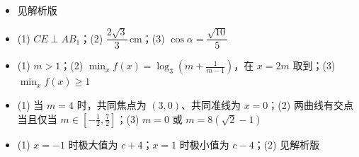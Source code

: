 \begin{itemize}[leftmargin=2.6em]
  \item[\textbf{一.}] 见解析版
  \item[\textbf{二.}] (1) $CE\perp AB_1$；(2) $\dfrac{2\sqrt3}{3}\,\mathrm{cm}$；(3) $\cos\alpha=\dfrac{\sqrt{10}}5$
  \item[\textbf{三.}] (1) $m>1$；(2) $\displaystyle\min_x f(x)=\log_3\!\left(m+\frac1{m-1}\right)$，在 $x=2m$ 取到；(3) $\min_x f(x)\geq1$
  \item[\textbf{四.}] (1) 当 $m=4$ 时，共同焦点为 $(3,0)$、共同准线为 $x=0$；(2) 两曲线有交点当且仅当 $m\in[-\tfrac12,\tfrac72]$；(3) $m=0$ 或 $m=8(\sqrt2-1)$
  \item[\textbf{五.}] (1) $x=-1$ 时极大值为 $c+4$；$x=1$ 时极小值为 $c-4$；(2) 见解析版
\end{itemize}
